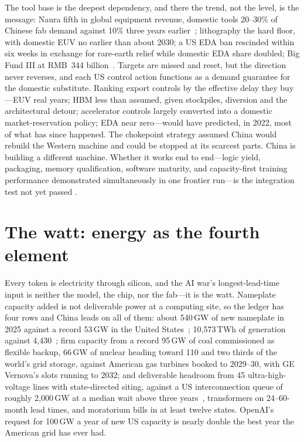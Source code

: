 The tool base is the deepest dependency, and there the trend, not the level, is the message: Naura fifth in global equipment revenue, domestic tools 20--30\% of Chinese fab demand against 10\% three years earlier~\cite{toolmakers-top20,naura}; lithography the hard floor, with domestic EUV no earlier than about 2030; a US EDA ban rescinded within six weeks in exchange for rare-earth relief while domestic EDA share doubled; Big Fund III at RMB~344 billion~\cite{bigfund,semi-wfe}. Targets are missed and reset, but the direction never reverses, and each US control action functions as a demand guarantee for the domestic substitute. Ranking export controls by the effective delay they buy---EUV real years; HBM less than assumed, given stockpiles, diversion and the architectural detour; accelerator controls largely converted into a domestic market-reservation policy; EDA near zero---would have predicted, in 2022, most of what has since happened. The chokepoint strategy assumed China would rebuild the Western machine and could be stopped at its scarcest parts. China is building a different machine. Whether it works end to end---logic yield, packaging, memory qualification, software maturity, and capacity-first training performance demonstrated simultaneously in one frontier run---is the integration test not yet passed .

\section{The watt: energy as the fourth element}
\label{c:energy}

Every token is electricity through silicon, and the AI war's longest-lead-time input is neither the model, the chip, nor the fab---it is the watt. Nameplate capacity added is not deliverable power at a computing site, so the ledger has four rows and China leads on all of them: about 540\,GW of new nameplate in 2025 against a record 53\,GW in the United States~\cite{nea-2025,us-additions}; 10,573\,TWh of generation against 4,430~\cite{ember-2026}; firm capacity from a record 95\,GW of coal commissioned as flexible backup, 66\,GW of nuclear heading toward 110 and two thirds of the world's grid storage, against American gas turbines booked to 2029--30, with GE Vernova's slots running to 2032; and deliverable headroom from 45 ultra-high-voltage lines with state-directed siting, against a US interconnection queue of roughly 2,000\,GW at a median wait above three years~\cite{lbl-queued}, transformers on 24--60-month lead times, and moratorium bills in at least twelve states. OpenAI's request for 100\,GW a year of new US capacity is nearly double the best year the American grid has ever had.


